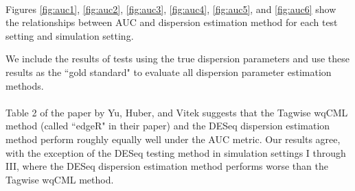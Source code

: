 \documentclass[10pt]{article}
\begin{document}
{ \paragraph{} \indent Figures \ref{fig:auc1}, \ref{fig:auc2}, \ref{fig:auc3}, \ref{fig:auc4}, \ref{fig:auc5}, and \ref{fig:auc6} 
show the relationships between AUC and dispersion estimation method for each test setting and simulation setting.} We include the results of tests using the true dispersion parameters and use these results as the ``gold standard" to evaluate all dispersion parameter estimation methods. %

{
\paragraph{} \indent Table 2 of the paper by Yu, Huber, and Vitek \cite{yu} suggests that the Tagwise wqCML method (called ``edgeR" in their paper) and the DESeq dispersion estimation method perform roughly equally well under the AUC metric. Our results agree, with the exception of the DESeq testing method in simulation settings I through III, where the DESeq dispersion estimation method performs worse than the Tagwise wqCML method. }
\end{document}
